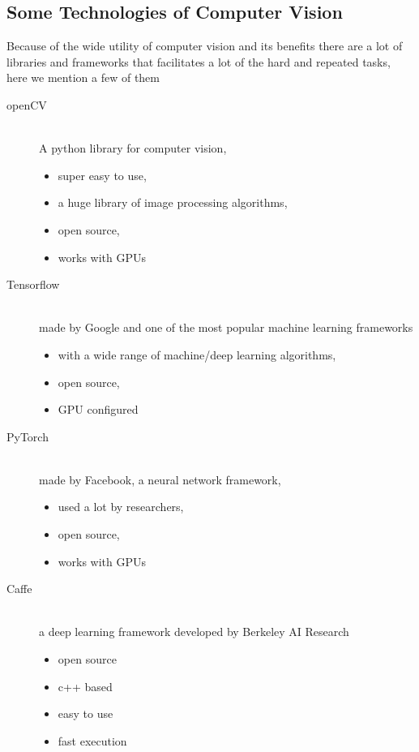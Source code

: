     \subsection{Some Technologies of Computer Vision}
        Because of the wide utility of computer vision and its benefits there are a lot of libraries and frameworks that facilitates a lot of the hard and repeated tasks, here we mention a few of them  ~\cite{mldlcv}
        \begin{description}
        \item[openCV] \hfill \\ 
            A python library for computer vision,
            \begin{itemize}
                \item super easy to use, 
                \item a huge library of image processing algorithms, 
                \item open source, 
                \item works with GPUs
            \end{itemize}
        \item[Tensorflow] \hfill \\
            made by Google and one of the most popular machine learning frameworks 
            \begin{itemize}
                \item with a wide range of machine/deep learning algorithms, 
                \item open source, 
                \item GPU configured
            \end{itemize}  
        \item[PyTorch] \hfill \\
            made by Facebook, a neural network framework, 
            \begin{itemize}
                \item used a lot by researchers, 
                \item open source, 
                \item works with GPUs
            \end{itemize}
        \item[Caffe] \hfill \\
            a deep learning framework developed by Berkeley AI Research
            \begin{itemize}
                \item open source
                \item c++ based 
                \item easy to use
                \item fast execution 
            \end{itemize}
        \end{description}
